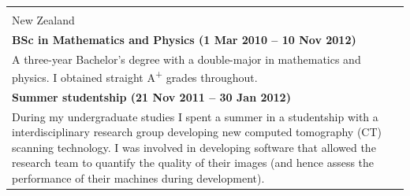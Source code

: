 \documentclass[10pt,a4paper,final]{article}
\begin{document}
\begin{tabularx}{\textwidth}{X}
{{\begin{minipage}[b]{0.7\linewidth}
            University of Otago \\ New Zealand
         \end{minipage}}
   }                                                                                                                                                                                                                                                                                                                                                            \\
   \rowcolor{seaborn_bg_grey_half}
   \rowcolor{seaborn_bg_grey_half}
   \textbf{BSc in Mathematics and Physics (1 Mar 2010 -- 10 Nov 2012)}                                                                                                                                                                                                                                                                                          \\
   \cellcolor{seaborn_bg_grey_half}%
   A three-year Bachelor's degree with a double-major in mathematics and physics. I obtained straight A\textsuperscript{+} grades throughout.
   \\
   \rowcolor{seaborn_bg_grey_half}
   \textbf{Summer studentship (21 Nov 2011 -- 30 Jan 2012)}                                                                                                                                                                                                                                                                                                     \\
   \rowcolor{seaborn_bg_grey_half}
   During my undergraduate studies I spent a summer in a studentship with a interdisciplinary research group developing new computed tomography (CT) scanning technology. I was involved in developing software that allowed the research team to quantify the quality of their images (and hence assess the performance of their machines during development). \\
\end{tabularx}
\end{document}
